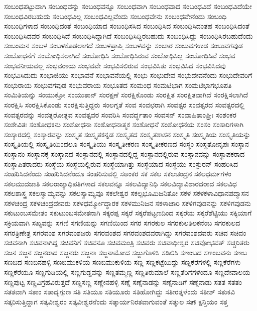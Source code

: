 {ಸಂಬಂಧಪಟ್ಟುದಾಗಿ
ಸಂಬಂಧವನ್ನು
ಸಂಬಂಧವನ್ನೂ
ಸಂಬಂಧವಾಗಿ
ಸಂಬಂಧವಾದ
ಸಂಬಂಧವಿದೆ
ಸಂಬಂಧವಿದೆಯೇ
ಸಂಬಂಧವಿರಬಹುದು
ಸಂಬಂಧವಿಲ್ಲ
ಸಂಬಂಧವಿಲ್ಲವೆಂದು
ಸಂಬಂಧವೇನು
ಸಂಬಂಧವೇನೆಂದು
ಸಂಬಂಧಿ
ಸಂಬಂಧಿಗಳಾದ
ಸಂಬಂಧಿದಂತೆ
ಸಂಬಂಧಿಯಾದ
ಸಂಬಂಧಿಸಸಿದ
ಸಂಬಂಧಿಸಿದ
ಸಂಬಂಧಿಸಿದಂತಹ
ಸಂಬಂಧಿಸಿದಂತೆ
ಸಂಬಂಧಿಸಿದವರ
ಸಂಬಂಧಿಸಿದೆ
ಸಂಬಂಧಿಸಿದ್ದಾಗಿದೆ
ಸಂಬಂಧಿಸಿದ್ದಿರಬಹುದು
ಸಂಬಂಧಿಸಿದ್ದು
ಸಂಬಂಧಿಸಿರಬಹುದೆಂದು
ಸಂಬಂಮನ
ಸಂಬಳ
ಸಂಬಳಕೊಡಲಾಗದೆ
ಸಂಬಳಪ್ರಾಪ್ತಿ
ಸಂಬಳವನ್ನು
ಸಂಬಾರ
ಸಂಬುವಗಉಡ
ಸಂಬುವಗವುಡ
ಸಂಬೋಧನೆಗೆ
ಸಂಬೋಧಿಸಲಾಗಿದೆ
ಸಂಬೋಧಿಸಿ
ಸಂಬೋಧಿಸಿರುವ
ಸಂಬೋಧಿಸಿಲ್ಲ
ಸಂಬೋಧಿಸಿವೆ
ಸಂಭವ
ಸಂಭವನೀಯವಲ್ಲ
ಸಂಭವರಾಯ
ಸಂಭವವೇ
ಸಂಭವಿಸಲಿರುವ
ಸಂಭವಿಸಿತು
ಸಂಭವಿಸಿದ
ಸಂಭವಿಸಿದವು
ಸಂಭವಿಸಿದುದು
ಸಂಭಾಜಿಯು
ಸಂಭಾವನೆ
ಸಂಭಾವನೆಯಲ್ಲಿ
ಸಂಭು
ಸಂಭುದೇವ
ಸಂಭುದೇವನೆಂದು
ಸಂಭುದೇವರಿಗೆ
ಸಂಭುರಾಯ
ಸಂಭುವಗವುಡ
ಸಂಭುವರಾಯ
ಸಂಭೂತದ
ಸಂಮಂಧ
ಸಂಮಟಿಭಾಗ
ಸಂಮಟಿಭಾಗಭೂಪತಿ
ಸಂಮಿತಿಯನ್ನು
ಸಂಯುಕ್ತೋ
ಸಂಯುತಾನ್
ಸಂರಕ್ಷಣೆ
ಸಂರಕ್ಷಿಕೊಂಡು
ಸಂರಕ್ಷಿತ
ಸಂರಕ್ಷಿತವಾಗಿದೆ
ಸಂರಕ್ಷಿಸಲಾಗಿದೆ
ಸಂರಕ್ಷಿಸಿ
ಸಂರಕ್ಷಿಸಿಕೊಂಡು
ಸಂರಕ್ಷಿಸುತ್ತಿದ್ದರು
ಸಂಲಗ್ನತೆ
ಸಂವ
ಸಂವಛರಾಗಿ
ಸಂವತ್ಸರ
ಸಂವತ್ಸರದ
ಸಂವತ್ಸರದಲ್ಲಿ
ಸಂವತ್ಸರವನ್ನು
ಸಂವತ್ಸರೋತ್ಸವ
ಸಂವತ್ಸವರ
ಸಂವರಿಸಿ
ಸಂವರ್ದ್ಧತಾಂ
ಸಂವಸನ್
ಸಂವಾಹಿತಾಂಘ್ರಿಃ
ಸಂಶಂಕರ
ಸಂಶೇವಿತಃ
ಸಂಶೋಧಕನು
ಸಂಶೋಧನಾ
ಸಂಶೋಧನಾತ್ಮಕ
ಸಂಶೋಧನೆ
ಸಂಶೋಧನೆಯ
ಸಂಸಂ
ಸಂಸಾರಿಗಳಾಗಿ
ಸಂಸ್ಕಾರದಲ್ಲಿ
ಸಂಸ್ಕಾರವನ್ನು
ಸಂಸ್ಕೃತ
ಸಂಸ್ಕೃತಕನ್ನಡ
ಸಂಸ್ಕೃತದ
ಸಂಸ್ಕೃತಶಾಸನ
ಸಂಸ್ಕೃತಿ
ಸಂಸ್ಕೃತಿಯ
ಸಂಸ್ಕೃತಿಯನ್ನು
ಸಂಸ್ಕೃತಿಯಲ್ಲಿ
ಸಂಸ್ಕೃತಿಯಿಂದಲೂ
ಸಂಸ್ಕೃತಿಯು
ಸಂಸ್ಕೃತೀಕರಣ
ಸಂಸ್ಕೃತೀಕರಣದ
ಸಂಸ್ಥಂ
ಸಂಸ್ಥತೋನೃಪಃ
ಸಂಸ್ಥಾನ
ಸಂಸ್ಥಾನಂ
ಸಂಸ್ಥಾನಕ್ಕೆ
ಸಂಸ್ಥಾನದ
ಸಂಸ್ಥಾನದಲ್ಲಿ
ಸಂಸ್ಥಾನದಲ್ಲಿದ್ದ
ಸಂಸ್ಥಾನದಲ್ಲಿರುವ
ಸಂಸ್ಥಾನವನ್ನು
ಸಂಸ್ಥಾಪಕರಾದ
ಸಂಸ್ಥಾಪಿತರಾದರು
ಸಂಸ್ಥೆಯ
ಸಂಸ್ಥೆಯಲ್ಲಿರುವ
ಸಂಸ್ಥೆಯಾಗಿತ್ತು
ಸಂಸ್ಥೆಯಾದ
ಸಂಸ್ಥೆಯು
ಸಂಸ್ಫುರನ್
ಸಂಹರಿಸಿದ
ಸಂಹರಿಸಿದನೆಂದು
ಸಂಹರಿಸಿದನೆಂದೂ
ಸಂಹರಿಸುವಲ್ಲಿ
ಸಅಂಕರ
ಸಕ
ಸಕಲ
ಸಕಲಚಂದ್ರನ
ಸಕಲಧರ್ಮಗಳಂ
ಸಕಲಮುದಜಾತಿ
ಸಕಲರಾಜ್ಯಾಧಿಪತಿಗಳಾದ
ಸಕಲವನ್ನೂ
ಸಕಲವಿದ್ಯಾನಿಧಿ
ಸಕಲವಿದ್ಯಾವಿಶಾರದರಾದ
ಸಕಲವಿಧ
ಸಕಲಶಾಸ್ತ್ರ
ಸಕಲಸ್ವಾಮ್ಯವನ್ನು
ಸಕಲಸ್ವಾಮ್ಯವೂ
ಸಕಲೇಶ್ವರ
ಸಕಲ್ಪಭೂಮಿಜನಿತೋ
ಸಕಳ
ಸಕಳಕಳಾವಿಧಾನಪದ್ಮಾಸನ
ಸಕಳಚಂದ್ರ
ಸಕಳಚಂದ್ರದೇವರು
ಸಕಳಧರ್ಮ್ಮೋದ್ಧಾರಕ
ಸಕಳಮುನಿಜನ
ಸಕಳಾಚಾರಿ
ಸಕಳಿಗವುಡನನ್ನು
ಸಕಳಿಗವುಡನು
ಸಕುಟುಂಬಸಮೇತಂ
ಸಕುಟುಂಬಸಮೇತನಾಗಿ
ಸಕ್ಕರಪ್ಪ
ಸಕ್ಕರೆ
ಸಕ್ಕರೆಪಟ್ಟಣದಿಂದ
ಸಕ್ಕರೆಯ
ಸಕ್ಕರೆಶೆಟ್ಟಿಯು
ಸಕ್ಕಿಯಾಗೆ
ಸಕ್ರಿಯವಾಗಿ
ಸಖ್ಯವನ್ನು
ಸಗಣಿ
ಸಗಣಿಯನ್ನು
ಸಗಣಿಯಿಂದ
ಸಗರ
ಸಗರಕುಲ
ಸಗರಕುಲತಿಲಕನೆಂಬ
ಸಗರಕುಲದ
ಸಗರತ್ರಿಣೇತ್ರ
ಸಗರವಂಶ
ಸಗರವಂಶಜರು
ಸಗರವಂಶದ
ಸಗರವಂಶದವರಾಗಿದ್ದು
ಸಗರವಂಶದವರು
ಸಚಿವ
ಸಚಿವಂ
ಸಚಿವನಾಗಿ
ಸಚಿವನಾಗಿದ್ದ
ಸಚಿವನಿಗೆ
ಸಚಿವನೂ
ಸಚಿವಮಂತ್ರಿ
ಸಚಿವರು
ಸಚಿವಾಧೀಶ್ವರ
ಸಚಿವೋಭವತ್
ಸಚ್ಚರಿತರು
ಸಜನ
ಸಜ್ಜನ
ಸಜ್ಜನರಾದ
ಸಜ್ಜನರು
ಸಜ್ಜನಾ
ಸಜ್ಜನಾಮೋದ
ಸಜ್ಜುಗೊಳಿಸಿ
ಸಡಿಲಿಸಿ
ಸಣಂಬದ
ಸಣಂಬವನು
ಸಣಬ
ಸಣಬದ
ಸಣಬಿನಹಳ್ಳಿ
ಸಣಬಿಮುಕಳಿಯ
ಸಣಬಿಮುಕುಳಿಯ
ಸಣ್ಣ
ಸಣ್ಣಕಟ್ಟೆಯಿದ್ದು
ಸಣ್ಣಕೆರೆಗಳಲ್ಲಿ
ಸಣ್ಣಕೆರೆಗಳು
ಸಣ್ಣಕೆರೆಯೂ
ಸಣ್ಣಗುಡಿಯಲ್ಲಿ
ಸಣ್ಣಗುಡ್ಡವನ್ನು
ಸಣ್ಣತಮ್ಮಣ್ಣ
ಸಣ್ಣತಿರುಮಾಲೆ
ಸಣ್ಣತೆರಿಗೆಗಳೆಂದೂ
ಸಣ್ಣದೇವಾಲಯ
ಸಣ್ಣಪುಟ್ಟ
ಸಣ್ಣವಿಗ್ರಹವಿರುತ್ತದೆ
ಸಣ್ಣಸಣ್ಣ
ಸಣ್ಣೇನಹಳ್ಳಿ
ಸಣ್ನೆ
ಸಣ್ನೆನಾಡನ್ನು
ಸಣ್ನೆನಾಡಿಗೆ
ಸಣ್ನೆನಾಡು
ಸತತ
ಸತತಂ
ಸತತವಾಗಿ
ಸತಾಂ
ಸತಾದೃಗ್ಗುಣ
ಸತಿ
ಸತಿಯೂ
ಸತಿಯೂರು
ಸತಿಹೋಗಿದ್ದು
ಸತೀರತ್ನಳೆಂದು
ಸತೀಶ್
ಸತುಕವಿ
ಸತ್ಕರಿಸುತ್ತಿದ್ದಾಗ
ಸತ್ಕವೀಶ್ವರಂ
ಸತ್ಕವೀಶ್ವರನೆಂದು
ಸತ್ಕಾರ್ಯನಿರತವಾಗುವಂತೆ
ಸತ್ಕುಲ
ಸತ್ಕ್ಷಾನ್ತಿಯಂ
ಸತ್ತ
}
